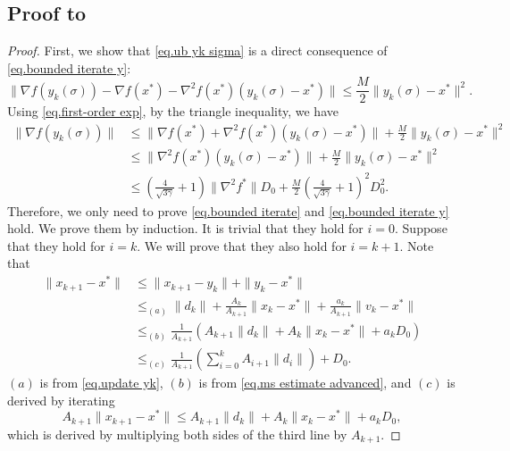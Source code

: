 \documentclass{article}
\numberwithin{equation}{section}
\numberwithin{equation}{section}
\begin{document}
\subsection*{Proof to }
\begin{proof}
    First, we show that \eqref{eq.ub yk sigma} is a direct consequence of \eqref{eq.bounded iterate y}:
    \begin{equation*}
        \|\nabla f(y_k(\sigma)) - \nabla f(x^*) -\nabla^2 f(x^*)(y_k(\sigma)-x^*)\| \leq \frac{M}{2}\|y_k(\sigma)-x^*\|^2.
    \end{equation*}
    Using \eqref{eq.first-order exp}, by the triangle inequality, we have
    \begin{equation*}
        \begin{aligned}
            \|\nabla f(y_k(\sigma)) \| & \leq \|\nabla f(x^*)+\nabla^2 f(x^*)(y_k(\sigma)-x^*)\| +\frac{M}{2}\|y_k(\sigma)-x^*\|^2                                    \\
                                       & \leq \|\nabla^2 f(x^*)(y_k(\sigma)-x^*)\|+\frac{M}{2}\|y_k(\sigma)-x^*\|^2                                                   \\
                                       & \leq \left(\frac{4}{\sqrt{3\gamma}}+1\right)\|\nabla ^2 f^*\|D_0+\frac{M}{2}\left(\frac{4}{\sqrt{3\gamma}}+1\right)^2 D_0^2.
        \end{aligned}
    \end{equation*}
    Therefore, we only need to prove \eqref{eq.bounded iterate} and \eqref{eq.bounded iterate y} hold. We prove them by induction. It is trivial that they hold for $i=0$. Suppose that they hold for $i=k$. We will prove that they also hold for $i=k+1$. Note that
    \begin{equation*}
        \begin{aligned}
            \|x_{k+1}-x^*\| & \leq \|x_{k+1}-y_k\| + \|y_k-x^*\|                                            \\
                            & \leq_{(a)} \|d_k\|+ \frac{A_k}{A_{k+1}} \|x_k-x^*\| +\frac{a_k}{A_{k+1}}\|v_k-x^*\| \\
                            & \leq_{(b)} \frac{1}{A_{k+1}}\left(A_{k+1}\|d_k\| +A_k\|x_k-x^*\| +  a_k D_0\right)  \\
                            & \leq_{(c)} \frac{1}{A_{k+1}}\left (\sum_{i=0}^k A_{i+1}\|d_i\|\right)+D_0.
        \end{aligned}
    \end{equation*}
    $(a)$ is from \eqref{eq.update yk}, $(b)$ is from \eqref{eq.ms estimate advanced}, and $(c)$ is derived by iterating
    \begin{equation*}
        A_{k+1} \|x_{k+1}-x^*\|\leq A_{k+1}\|d_k\|+A_k\|x_k-x^*\|+a_k D_0,
    \end{equation*}
    which is derived by multiplying both sides of the third line by $A_{k+1}$.


\end{proof}
\end{document}
